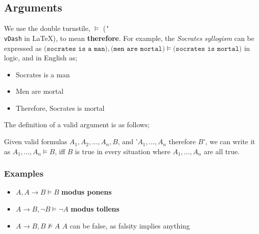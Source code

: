 \documentclass[a4paper, 12pt]{article}
\begin{document}
        \subsection*{Arguments}
        We use the double turnstile, $\vDash$ (\texttt{\char`\\vDash} in \LaTeX), to mean \textbf{therefore}. For example, the \textit{Socrates syllogism} can be expressed as $\texttt{(socrates is a man)}, \texttt{(men are mortal)} \vDash \texttt{(socrates is mortal)}$ in logic, and in English as;
        \begin{itemize}
            \item Socrates is a man
            \item Men are mortal
            \item Therefore, Socrates is mortal
        \end{itemize}
        \medskip

        The definition of a valid argument is as follows;
        \smallskip

        Given valid formulas $A_1, A_2, ..., A_n, B$, and '$A_1, ..., A_n$ therefore $B$', we can write it as $A_1, ..., A_n \vDash B$, iff $B$ is true in every situation where $A_1, ..., A_n$ are all true.
        \subsubsection*{Examples}
        \begin{itemize}
            \item $A, A \rightarrow B \vDash B$ \hfill \textbf{modus ponens}
            \item $A \rightarrow B, \neg B \vDash \neg A$ \hfill \textbf{modus tollens}
            \item $A \rightarrow B, B \nvDash A$ \hfill $A$ can be false, as falsity implies anything
        \end{itemize}
\end{document}
